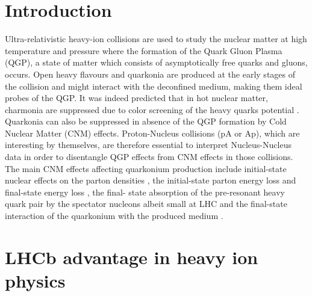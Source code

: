 \documentclass[
10pt, %
a4paper, %
oneside, %
headinclude,footinclude, %
BCOR5mm, %
]{scrartcl}
\begin{document}


\newpage %


\section{Introduction}

Ultra-relativistic heavy-ion collisions are used to study the nuclear matter at high temperature and pressure where the formation of the Quark Gluon Plasma (QGP), a state of matter which consists of asymptotically free quarks and gluons, occurs. Open heavy flavours and quarkonia are produced at the early stages of the collision and might interact with the deconfined medium, making them ideal probes of the QGP. It was indeed predicted that in hot nuclear matter, charmonia are suppressed due to color screening of the heavy quarks potential . Quarkonia can also be suppressed in absence of the QGP formation by Cold Nuclear Matter (CNM) effects. Proton-Nucleus collisions (pA or Ap), which are interesting by themselves, are therefore essential to interpret Nucleus-Nucleus data in order to disentangle QGP effects from CNM effects in those collisions. The main CNM effects affecting quarkonium production include initial-state nuclear effects on the parton densities , the initial-state parton energy loss and final-state energy loss , the final- state absorption of the pre-resonant heavy quark pair by the spectator nucleons  albeit small at LHC  and the final-state interaction of the quarkonium with the produced medium .

\section{LHCb advantage in heavy ion physics}
\end{document}
